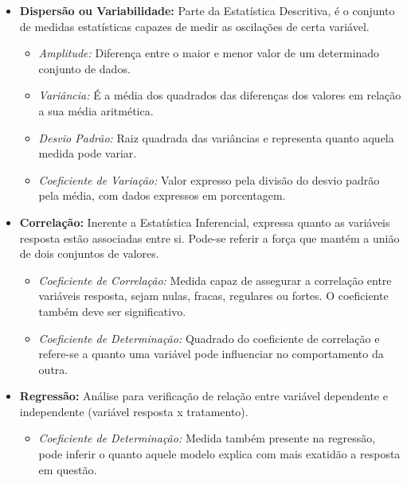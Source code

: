 \documentclass[12pt,a4paper]{article}
\begin{document}
\begin{itemize}
\item \textbf{Dispersão ou Variabilidade:} Parte da Estatística Descritiva, é o conjunto de medidas estatísticas capazes de medir as oscilações  de certa variável.
	\begin{itemize} 
		\item \textit{Amplitude:} Diferença entre o maior e menor valor de um determinado conjunto de dados.
		\item \textit{Variância:} É a média dos quadrados das diferenças dos valores em relação a sua média aritmética.
		\item \textit{Desvio Padrão:} Raiz quadrada das variâncias e representa quanto aquela medida pode variar.
		\item \textit{Coeficiente de Variação:} Valor expresso pela divisão do desvio padrão pela média, com dados expressos em porcentagem.
	\end{itemize}
\end{itemize}

\begin{itemize}
\item \textbf{Correlação:} Inerente a Estatística Inferencial, expressa quanto as variáveis resposta estão associadas entre si. Pode-se referir a força que mantém a união de dois conjuntos de valores.
	\begin{itemize} 
		\item \textit{Coeficiente de Correlação:} Medida capaz de assegurar a correlação entre variáveis resposta, sejam nulas, fracas, regulares ou fortes. O coeficiente também deve ser significativo.
		\item \textit{Coeficiente de Determinação:} Quadrado do coeficiente de correlação e refere-se a quanto uma variável pode influenciar no comportamento da outra.
	\end{itemize}
\end{itemize}

\begin{itemize}
\item \textbf{Regressão:} Análise para verificação de relação entre variável dependente e independente (variável resposta x tratamento).
	\begin{itemize} 
		\item \textit{Coeficiente de Determinação:} Medida também presente na regressão, pode inferir o quanto aquele modelo explica com mais exatidão a resposta em questão.
	\end{itemize}
\end{itemize}
		
\end{document}
